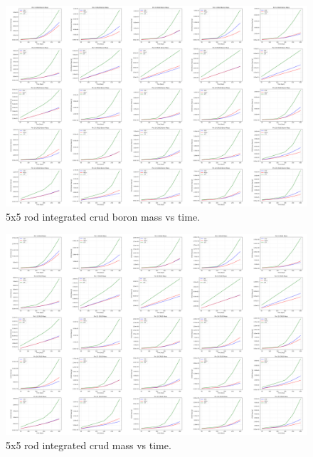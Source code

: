 \begin{landscape}
\begin{figure}[H]
    \centering
    \includegraphics[width=0.9\linewidth]{figs/5x5/imp/montage_time_bmass_sm}
    \caption{5x5 rod integrated crud boron mass vs time.}
    \label{fig:montagetimebmasssm}
\end{figure}


\begin{figure}[H]
    \centering
    \includegraphics[width=0.9\linewidth]{figs/5x5/imp/montage_time_cmass_sm}
    \caption{5x5 rod integrated crud mass vs time.}
    \label{fig:montagetimecmasssm}
\end{figure}

\end{landscape}
